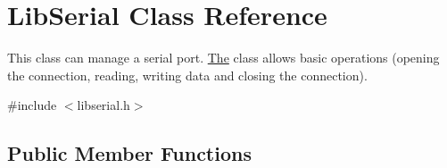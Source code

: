 \hypertarget{class_lib_serial}{}\section{Lib\+Serial Class Reference}
\label{class_lib_serial}


This class can manage a serial port. \hyperlink{class_the}{The} class allows basic operations (opening the connection, reading, writing data and closing the connection).  




{\ttfamily \#include $<$libserial.\+h$>$}

\subsection*{Public Member Functions}

